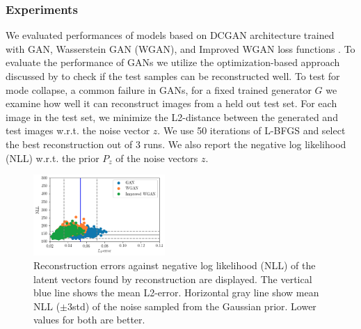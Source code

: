 \documentclass{article}
\newcommand{\squeezeup}{\vspace{-2.5mm}}
\begin{document}
\subsubsection{Experiments}
\label{sssec:gansubsubhead1}
\squeezeup
We evaluated performances of models based on DCGAN
architecture trained with GAN, Wasserstein GAN (WGAN), and Improved WGAN loss functions \cite{NIPS2014_5423,2017arXiv170107875A,DBLP:journals/corr/GulrajaniAADC17}. To evaluate the performance of GANs we utilize the optimization-based approach discussed by \cite{osokin2017biogans} to check if the test samples can be reconstructed well. To test for mode collapse, a common failure in GANs, for a fixed trained generator $G$ we examine how well it can reconstruct images from a held out test set. For each image in the test set, we minimize the L2-distance between the generated and test images w.r.t. the noise vector $z$. We use 50 iterations of L-BFGS and select the best reconstruction out of 3 runs. We also report the negative log likelihood (NLL) w.r.t. the prior \(P_{z}\) of the noise vectors $z$. 
\squeezeup
\begin{figure}[htb]
\begin{minipage}[b]{1.0\linewidth}
  \centering
  \centerline{\includegraphics[width=5cm]{ganerror}}
  \vspace{-0.3cm}
\end{minipage}
\caption{Reconstruction errors against negative log likelihood (NLL) of the latent vectors found by reconstruction are displayed. The vertical blue line shows the mean L2-error. Horizontal gray line show mean NLL (\(\pm 3\)std) of the noise sampled from the Gaussian prior. Lower values for both are better.}
\vspace{-0.5cm}
\end{figure}
\squeezeup
\vspace{-0.25cm} 
\end{document}
